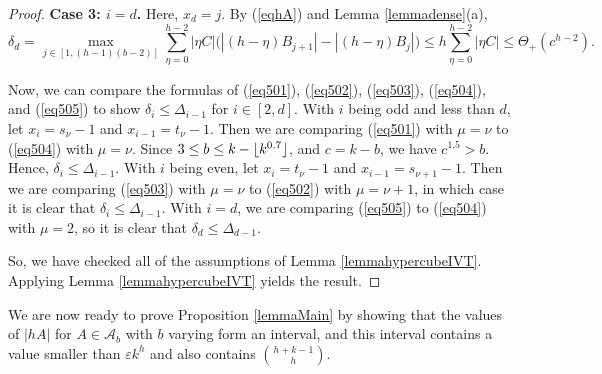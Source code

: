 \documentclass[10pt,a4paper]{article}
\theoremstyle{definition}
\theoremstyle{remark}
\numberwithin{equation}{section}
\numberwithin{theorem}{section}
\newcommand{\cala}{\mathcal{A}}
\DeclarePairedDelimiter{\floor}{\lfloor}{\rfloor}
\begin{document}
\begin{proof}
    \textbf{Case 3: $i = d$.} Here, $x_d = j$. By (\ref{eqhA}) and Lemma \ref{lemmadense}(a), \begin{equation}\label{eq505}
        \delta_d = \max_{j \in [1,(h-1)(b-2)]} \sum_{\eta = 0}^{h-2} |\eta C|\big(|(h-\eta)B_{j+1}|-|(h-\eta)B_{j}|\big) \leq h \sum_{\eta = 0}^{h-2} |\eta C| \leq \Theta_+(c^{h-2}).
    \end{equation}

    Now, we can compare the formulas of (\ref{eq501}), (\ref{eq502}), (\ref{eq503}), (\ref{eq504}), and (\ref{eq505}) to show $\delta_i \leq \Delta_{i-1}$ for $i \in [2,d]$. With $i$ being odd and less than $d$, let $x_i = s_{\nu}-1$ and $x_{i-1} = t_{\nu}-1$. Then we are comparing (\ref{eq501}) with $\mu = \nu$ to (\ref{eq504}) with $\mu = \nu$. Since $3 \leq b \leq k-\floor{k^{0.7}}$, and $c = k-b$, we have $c^{1.5} > b$. Hence, $\delta_i \leq \Delta_{i-1}$. With $i$ being even, let $x_i = t_{\nu}-1$ and $x_{i-1} = s_{\nu+1}-1$. Then we are comparing (\ref{eq503}) with $\mu=\nu$ to (\ref{eq502}) with $\mu = \nu+1$, in which case it is clear that $ \delta_i \leq \Delta_{i-1}$. With $i = d$, we are comparing (\ref{eq505}) to (\ref{eq504}) with $\mu = 2$, so it is clear that $ \delta_d \leq \Delta_{d-1}$. 

    So, we have checked all of the assumptions of Lemma \ref{lemmahypercubeIVT}. Applying Lemma \ref{lemmahypercubeIVT} yields the result.
\end{proof}

We are now ready to prove Proposition \ref{lemmaMain} by showing that the values of $|hA|$ for $A \in \cala_b$ with $b$ varying form an interval, and this interval contains a value smaller than $\varepsilon k^h$ and also contains $\binom{h+k-1}{h}$.
\end{document}
